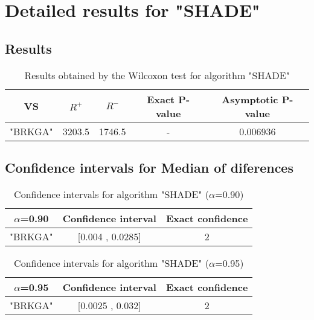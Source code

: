 \documentclass[a4paper,10pt]{article}
\begin{document}
 \clearpage 


\section{Detailed results for "SHADE"}


\subsection{Results}

\begin{table}[!htp]
\centering\small
\begin{tabular}{
|c|c|c|c|c|}
\hline
 VS & $R^{+}$ & $R^{-}$ & Exact P-value & Asymptotic P-value \\ \hline 
"BRKGA" & 3203.5 & 1746.5 & - & 0.006936\\ \hline 

\end{tabular}
\caption{Results obtained by the Wilcoxon test for algorithm "SHADE"}
\end{table}

\subsection{Confidence intervals for Median of diferences}

\begin{table}[!htp]
\centering\small
\begin{tabular}{
|c|c|c|}
\hline
 $\alpha$=0.90 & Confidence interval & Exact confidence \\ \hline 
"BRKGA" & [0.004 , 0.0285] & 2\\ \hline 

\end{tabular}
\caption{Confidence intervals for algorithm "SHADE" ($\alpha$=0.90)}
\end{table}
\begin{table}[!htp]
\centering\small
\begin{tabular}{
|c|c|c|}
\hline
 $\alpha$=0.95 & Confidence interval & Exact confidence \\ \hline 
"BRKGA" & [0.0025 , 0.032] & 2\\ \hline 

\end{tabular}
\caption{Confidence intervals for algorithm "SHADE" ($\alpha$=0.95)}
\end{table}

 \clearpage 
\end{document}

